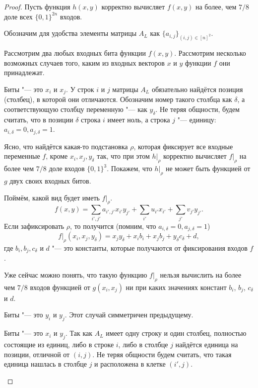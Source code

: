 \documentclass[oneside, a4paper]{article}
\theoremstyle{definition}
\theoremstyle{remark}
\begin{document}
\begin{proof}
Пусть функция $h(x, y)$ корректно вычисляет $f(x, y)$ на более, чем $7/8$ доле
всех $\{0, 1\}^{2n}$ входов.

Обозначим для удобства элементы матрицы $A_L$ как $\{a_{i, j}\}_{(i, j) \in {[n]^2}}$.

Рассмотрим два любых входных бита функции $f(x, y)$. Рассмотрим несколько
возможных случаев того, каким из входных векторов $x$ и $y$ функции $f$ они
принадлежат.
\begin{description}
\item{Биты "--- это $x_i$ и $x_j$.} У строк $i$ и $j$ матрицы $A_L$ обязательно
найдётся позиция (столбец), в которой они отличаются. Обозначим номер такого
столбца как $\delta$, а соответствующую столбцу переменную "--- как $y_\delta$.
Не теряя общности, будем считать, что в позиции $\delta$ строка $i$ имеет ноль,
а строка $j$ "--- единицу: $a_{i, \delta} = 0, a_{j, \delta} = 1$.

Ясно, что найдётся какая-то подстановка $\rho$, которая фиксирует все входные
переменные $f$, кроме $x_i, x_j, y_\delta$ так, что при этом $h \rvert _ \rho$
корректно вычисляет $f \rvert _ \rho$ на более чем $7/8$ доле входов $\{0,
1\}^3$. Покажем, что $h \rvert _ \rho$ не может быть функцией от $g$ двух своих
входных битов.

Поймём, какой вид будет иметь $f \rvert _ \rho$. 
\[
f(x, y) = \sum_{i', j'} a_{i', j'} x_{i'} y_{j'} + \sum_{i'} u_{i'} x_{i'} + \sum_{j'} v_{j'} y_{j'}.
\]
Если зафиксировать $\rho$, то получится (помним, что $a_{i, \delta} = 0, a_{j, \delta} = 1$)
\[
f \rvert _ \rho (x_i, x_j, y_\delta) = x_j y_\delta + x_i b_i + x_j b_j + y_\delta c_\delta + d,
\]
где $b_i, b_j, c_\delta$ и $d$ "--- это константы, которые получаются от
фиксирования входов $f$.

Уже сейчас можно понять, что такую функцию $f \rvert _ \rho$ нельзя вычислить на
более чем $7/8$ входов функцией от $g(x_i, x_j)$ ни при каких значениях констант
$b_i$, $b_j$, $c_\delta$ и $d$.


\item{Биты "--- это $y_i$ и $y_j$.} Этот случай симметричен предыдущему.
\item{Биты "--- это $x_i$ и $y_j$.} Так как $A_L$ имеет одну строку и один
столбец, полностью состоящие из единиц, либо в строке $i$, либо в столбце $j$
найдётся единица на позиции, отличной от $(i, j)$. Не теряя общности будем
считать, что такая единица нашлась в столбце $j$ и расположена в клетке $(i',
j)$.


\end{description}
\end{proof}
\end{document}
